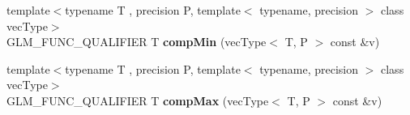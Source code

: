 \begin{DoxyCompactItemize}
\item 
{\footnotesize template$<$typename T , precision P, template$<$ typename, precision $>$ class vec\+Type$>$ }\\G\+L\+M\+\_\+\+F\+U\+N\+C\+\_\+\+Q\+U\+A\+L\+I\+F\+I\+ER T {\bfseries comp\+Min} (vec\+Type$<$ T, P $>$ const \&v)\hypertarget{namespaceglm_a1577bdcf5f8b76fb66296ac53fe77fa8}{}\label{namespaceglm_a1577bdcf5f8b76fb66296ac53fe77fa8}

\item 
{\footnotesize template$<$typename T , precision P, template$<$ typename, precision $>$ class vec\+Type$>$ }\\G\+L\+M\+\_\+\+F\+U\+N\+C\+\_\+\+Q\+U\+A\+L\+I\+F\+I\+ER T {\bfseries comp\+Max} (vec\+Type$<$ T, P $>$ const \&v)\hypertarget{namespaceglm_a6d3b715875f887b364a34a7529c8fc1b}{}\label{namespaceglm_a6d3b715875f887b364a34a7529c8fc1b}


\end{DoxyCompactItemize}
